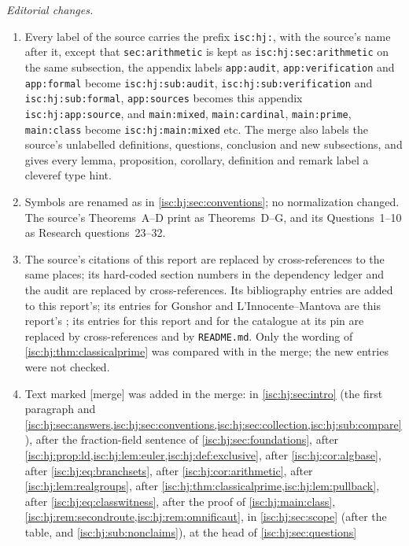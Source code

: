 \documentclass[11pt,letterpaper]{article}
\theoremstyle{definition}
\theoremstyle{remark}
\newcommand{\rpath}[1]{\nolinkurl{#1}}%
\newcommand{\lbl}[1]{\nolinkurl{#1}}%
\newcommand{\mtag}{\textup{[merge]}}%
\numberwithin{equation}{section}
\begin{document}
\emph{Editorial changes.}
\begin{enumerate}[label=(\arabic*)]
\item Every label of the source carries the prefix \texttt{isc:hj:}, with
the source's name after it, except that \texttt{sec:arithmetic} is kept as
\lbl{isc:hj:sec:arithmetic} on the same subsection, the appendix labels
\texttt{app:audit}, \texttt{app:verification} and \texttt{app:formal} become
\lbl{isc:hj:sub:audit}, \lbl{isc:hj:sub:verification} and
\lbl{isc:hj:sub:formal}, \texttt{app:sources} becomes this appendix
\lbl{isc:hj:app:source}, and \texttt{main:mixed}, \texttt{main:cardinal},
\texttt{main:prime}, \texttt{main:class} become
\lbl{isc:hj:main:mixed} etc. The merge also labels the source's unlabelled
definitions, questions, conclusion and new subsections, and gives every
lemma, proposition, corollary, definition and remark label a cleveref type
hint.
\item Symbols are renamed as in \cref{isc:hj:sec:conventions}; no
normalization changed. The source's Theorems~A--D print as
Theorems~D--G, and its Questions~1--10 as Research questions~23--32.
\item The source's citations of this report are replaced by
cross-references to the same places; its hard-coded section numbers in the
dependency ledger and the audit are replaced by cross-references. Its
bibliography entries \cite{Conway,Hahn,Kaplansky,Pitteloud,BKK} are added
to this report's; its entries for Gonshor and L'Innocente--Mantova are this
report's \cite{Gonshor,LM}; its entries for this report and for the
catalogue at its pin are replaced by cross-references and by
\rpath{README.md}. Only the wording of \cref{isc:hj:thm:classicalprime} was
compared with \cite{LM} in the merge; the new entries were not checked.
\item Text marked \mtag{} was added in the merge: in
\cref{isc:hj:sec:intro} (the first paragraph and
\cref{isc:hj:sec:answers,isc:hj:sec:conventions,isc:hj:sec:collection,isc:hj:sub:compare}),
after the fraction-field sentence of \cref{isc:hj:sec:foundations}, after
\cref{isc:hj:prop:ld,isc:hj:lem:euler,isc:hj:def:exclusive}, after
\cref{isc:hj:cor:algbase}, after \eqref{isc:hj:eq:branchsets}, after
\cref{isc:hj:cor:arithmetic}, after \cref{isc:hj:lem:realgroups}, after
\cref{isc:hj:thm:classicalprime,isc:hj:lem:pullback}, after
\eqref{isc:hj:eq:classwitness}, after the proof of \cref{isc:hj:main:class},
\cref{isc:hj:rem:secondroute,isc:hj:rem:omnificaut}, in
\cref{isc:hj:sec:scope} (after the table, and
\cref{isc:hj:sub:nonclaims}), at the head of \cref{isc:hj:sec:questions}

\end{enumerate}
\end{document}
